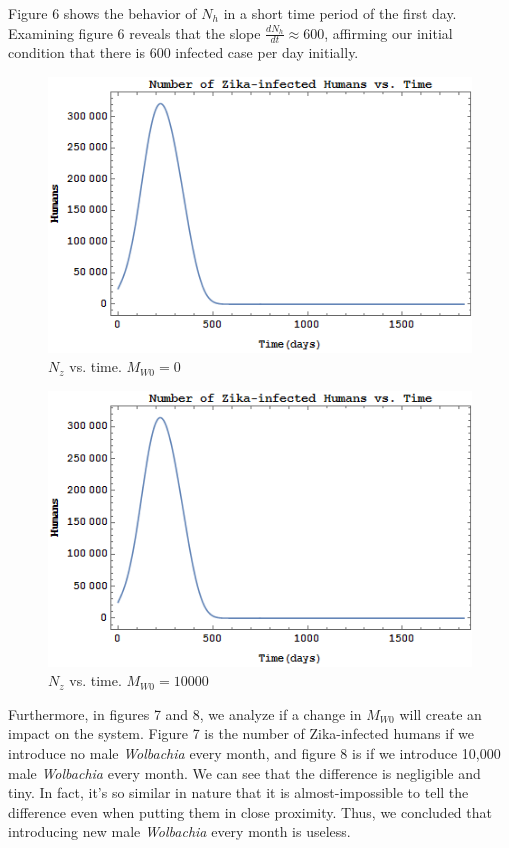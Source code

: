 \documentclass{article}
\begin{document}
Figure 6 shows the behavior of $N_h$ in a short time period of the first day. Examining figure 6 reveals that the slope $\frac{dN_h}{dt}\approx600$, affirming our initial condition that there is 600 infected case per day initially. \\

\begin{figure}[h!]
  \includegraphics[width=\linewidth]{NzVst-Mw0=0}
  \caption{$N_z$ vs. time. $M_{W0}=0$}
  \label{fig:nzvstmw00}
\end{figure}

\begin{figure}[h!]
  \includegraphics[width=\linewidth]{NzVst-Mw0=10000}
  \caption{$N_z$ vs. time. $M_{W0}=10000$}
  \label{fig:nzvstmw01000}
\end{figure}
Furthermore, in figures 7 and 8, we analyze if a change in $M_{W0}$ will create an impact on the system. Figure 7 is the number of Zika-infected humans if we introduce no male \textit{Wolbachia} every month, and figure 8 is if we introduce 10,000 male \textit{Wolbachia} every month. We can see that the difference is negligible and tiny. In fact, it's so similar in nature that it is almost-impossible to tell the difference even when putting them in close proximity. Thus, we concluded that introducing new male \textit{Wolbachia} every month is useless.
\end{document}
